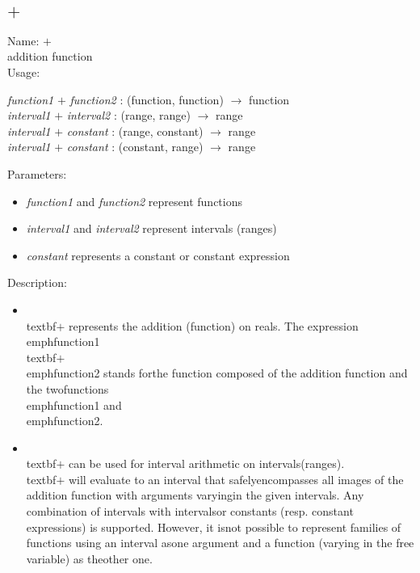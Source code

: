 \subsection{$+$}
\label{labplus}
\noindent Name: \textbf{$+$}\\
addition function\\
\noindent Usage: 
\begin{center}
\emph{function1} \textbf{$+$} \emph{function2} : (\textsf{function}, \textsf{function}) $\rightarrow$ \textsf{function}\\
\emph{interval1} \textbf{$+$} \emph{interval2} : (\textsf{range}, \textsf{range}) $\rightarrow$ \textsf{range}\\
\emph{interval1} \textbf{$+$} \emph{constant} : (\textsf{range}, \textsf{constant}) $\rightarrow$ \textsf{range}\\
\emph{interval1} \textbf{$+$} \emph{constant} : (\textsf{constant}, \textsf{range}) $\rightarrow$ \textsf{range}\\
\end{center}
Parameters: 
\begin{itemize}
\item \emph{function1} and \emph{function2} represent functions
\item \emph{interval1} and \emph{interval2} represent intervals (ranges)
\item \emph{constant} represents a constant or constant expression
\end{itemize}
\noindent Description: \begin{itemize}

\item \\textbf{$+$} represents the addition (function) on reals. \n   The expression \\emph{function1} \\textbf{$+$} \\emph{function2} stands for\n   the function composed of the addition function and the two\n   functions \\emph{function1} and \\emph{function2}.\n
\item \\textbf{$+$} can be used for interval arithmetic on intervals\n   (ranges). \\textbf{$+$} will evaluate to an interval that safely\n   encompasses all images of the addition function with arguments varying\n   in the given intervals.  Any combination of intervals with intervals\n   or constants (resp. constant expressions) is supported. However, it is\n   not possible to represent families of functions using an interval as\n   one argument and a function (varying in the free variable) as the\n   other one.\n\end{itemize}
